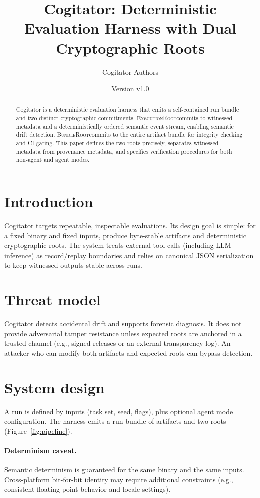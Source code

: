 \documentclass[11pt]{article}
\title{Cogitator: Deterministic Evaluation Harness with Dual Cryptographic Roots}
\author{Cogitator Authors}
\date{Version v1.0}
\newcommand{\ExecutionRoot}{\textsc{ExecutionRoot}}
\newcommand{\BundleRoot}{\textsc{BundleRoot}}
\begin{document}
\maketitle

\begin{abstract}
Cogitator is a deterministic evaluation harness that emits a self-contained run bundle
and two distinct cryptographic commitments. \ExecutionRoot commits to witnessed metadata
and a deterministically ordered semantic event stream, enabling semantic drift detection.
\BundleRoot commits to the entire artifact bundle for integrity checking and CI gating.
This paper defines the two roots precisely, separates witnessed metadata from provenance
metadata, and specifies verification procedures for both non-agent and agent modes.
\end{abstract}

\section{Introduction}
Cogitator targets repeatable, inspectable evaluations. Its design goal is simple:
for a fixed binary and fixed inputs, produce byte-stable artifacts and deterministic
cryptographic roots. The system treats external tool calls (including LLM inference)
as record/replay boundaries and relies on canonical JSON serialization to keep
witnessed outputs stable across runs.

\section{Threat model}
Cogitator detects accidental drift and supports forensic diagnosis.
It does not provide adversarial tamper resistance unless expected roots are
anchored in a trusted channel (e.g., signed releases or an external transparency log).
An attacker who can modify both artifacts and expected roots can bypass detection.

\section{System design}
A run is defined by inputs (task set, seed, flags), plus optional agent mode
configuration. The harness emits a run bundle of artifacts and two roots
(Figure~\ref{fig:pipeline}).

\paragraph{Determinism caveat.}
Semantic determinism is guaranteed for the same binary and the same inputs.
Cross-platform bit-for-bit identity may require additional constraints
(e.g., consistent floating-point behavior and locale settings).
\end{document}
